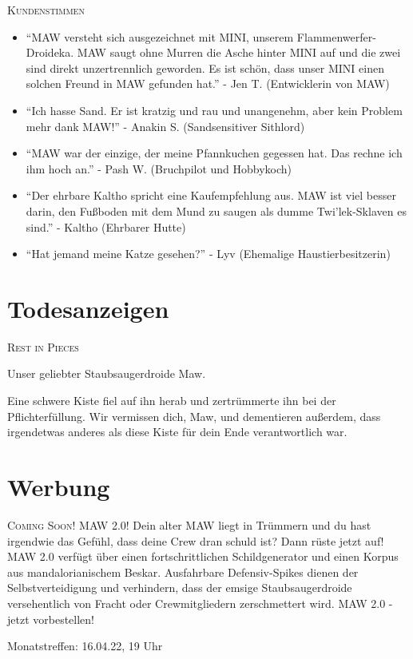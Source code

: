 \documentclass[final]{multiversum}
\begin{document}
\noindent\textsc{Kundenstimmen}
\begin{itemize}
\item \enquote{MAW versteht sich ausgezeichnet mit MINI, unserem Flammenwerfer-Droideka.
      MAW saugt ohne Murren die Asche hinter MINI auf und die zwei sind direkt unzertrennlich geworden. 
      Es ist schön, dass unser MINI einen solchen Freund in MAW gefunden hat.}
      - Jen T. (Entwicklerin von MAW)
\item \enquote{Ich hasse Sand. 
      Er ist kratzig und rau und unangenehm, aber kein Problem mehr dank MAW!}
      - Anakin S. (Sandsensitiver Sithlord)
\item \enquote{MAW war der einzige, der meine Pfannkuchen gegessen hat.
      Das rechne ich ihm hoch an.}
      - Pash W. (Bruchpilot und Hobbykoch)
\item \enquote{Der ehrbare Kaltho spricht eine Kaufempfehlung aus.
      MAW ist viel besser darin, den Fußboden mit dem Mund zu saugen als dumme Twi'lek-Sklaven es sind.}
      - Kaltho (Ehrbarer Hutte)
\item \enquote{Hat jemand meine Katze gesehen?}
      - Lyv (Ehemalige Haustierbesitzerin)
\end{itemize}

\section{Todesanzeigen}
\textsc{Rest in Pieces}
\begin{center}Unser geliebter Staubsaugerdroide Maw.\end{center} 
Eine schwere Kiste fiel auf ihn herab und zertrümmerte ihn bei der Pflichterfüllung.
Wir vermissen dich, Maw, und dementieren außerdem, dass irgendetwas anderes als diese Kiste für dein Ende verantwortlich war. 

\section{Werbung}
\textsc{Coming Soon! MAW 2.0!}
Dein alter MAW liegt in Trümmern und du hast irgendwie das Gefühl, dass deine Crew dran schuld ist? 
Dann rüste jetzt auf! MAW 2.0 verfügt über einen fortschrittlichen Schildgenerator und einen Korpus aus mandalorianischem Beskar. Ausfahrbare Defensiv-Spikes dienen der Selbstverteidigung und verhindern, dass der emsige Staubsaugerdroide versehentlich von Fracht oder Crewmitgliedern zerschmettert wird. 
MAW 2.0 - jetzt vorbestellen!


\begin{termine}
\item Monatstreffen: 16.04.22, 19 Uhr
\end{termine}
\impressum
\end{document}
